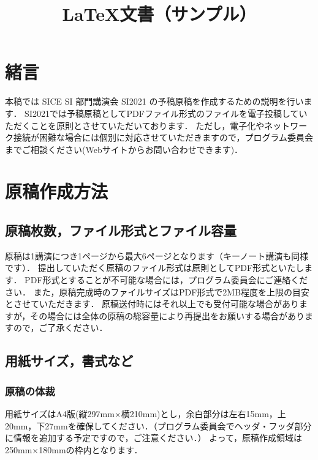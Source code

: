 \documentclass[a4paper]{jarticle}
\begin{document}
%
\title{LaTeX文書（サンプル）} %
%
\maketitle
%
\section{緒言}
本稿では SICE SI 部門講演会 SI2021 の予稿原稿を作成するための説明を行います．
SI2021では予稿原稿としてPDFファイル形式のファイルを電子投稿していただくことを原則とさせていただいております．
ただし，電子化やネットワーク接続が困難な場合には個別に対応させていただきますので，プログラム委員会までご相談ください(Webサイトからお問い合わせできます)．
%
\section{原稿作成方法}
\subsection{原稿枚数，ファイル形式とファイル容量}
原稿は1講演につき1ページから最大6ページとなります（キーノート講演も同様です）．
提出していただく原稿のファイル形式は原則としてPDF形式といたします．
PDF形式とすることが不可能な場合には，プログラム委員会にご連絡ください．
また，原稿完成時のファイルサイズはPDF形式で2MB程度を上限の目安とさせていただきます．
原稿送付時にはそれ以上でも受付可能な場合がありますが，その場合には全体の原稿の総容量により再提出をお願いする場合がありますので，ご了承ください．
%
\subsection{用紙サイズ，書式など}
\subsubsection{原稿の体裁}
用紙サイズはA4版(縦297mm$\times$横210mm)とし，余白部分は左右15mm，上20mm，下27mmを確保してください．（プログラム委員会でヘッダ・フッダ部分に情報を追加する予定ですので，ご注意ください．）
よって，原稿作成領域は250mm$\times$180mmの枠内となります．
%
\end{document}
